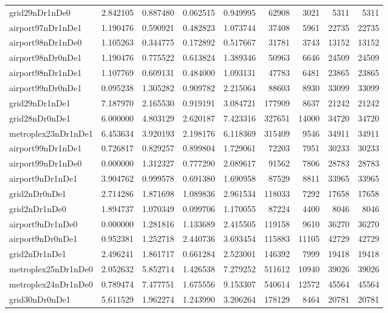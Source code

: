 \begin{longtable}{|l|r|r|r|r|r|r|r|r|}
grid29nDr1nDe0 & 2.842105 & 0.887480 & 0.062515 & 0.949995 & 62908 & 3021 & 5311 & 5311 \\
airport97nDr1nDe1 & 1.190476 & 0.590921 & 0.482823 & 1.073744 & 37408 & 5961 & 22735 & 22735 \\
airport98nDr1nDe0 & 1.105263 & 0.344775 & 0.172892 & 0.517667 & 31781 & 3743 & 13152 & 13152 \\
airport98nDr0nDe1 & 1.190476 & 0.775522 & 0.613824 & 1.389346 & 50963 & 6646 & 24509 & 24509 \\
airport98nDr1nDe1 & 1.107769 & 0.609131 & 0.484000 & 1.093131 & 47783 & 6481 & 23865 & 23865 \\
airport99nDr0nDe1 & 0.095238 & 1.305282 & 0.909782 & 2.215064 & 88603 & 8930 & 33099 & 33099 \\
grid29nDr1nDe1 & 7.187970 & 2.165530 & 0.919191 & 3.084721 & 177909 & 8637 & 21242 & 21242 \\
grid28nDr0nDe1 & 6.000000 & 4.803129 & 2.620187 & 7.423316 & 327651 & 14000 & 34720 & 34720 \\
metroplex23nDr1nDe1 & 6.453634 & 3.920193 & 2.198176 & 6.118369 & 315409 & 9546 & 34911 & 34911 \\
airport99nDr1nDe1 & 0.726817 & 0.829257 & 0.899804 & 1.729061 & 72203 & 7951 & 30233 & 30233 \\
airport99nDr1nDe0 & 0.000000 & 1.312327 & 0.777290 & 2.089617 & 91562 & 7806 & 28783 & 28783 \\
airport9nDr1nDe1 & 3.904762 & 0.999578 & 0.691380 & 1.690958 & 87529 & 8811 & 33965 & 33965 \\
grid2nDr0nDe1 & 2.714286 & 1.871698 & 1.089836 & 2.961534 & 118033 & 7292 & 17658 & 17658 \\
grid2nDr1nDe0 & 1.894737 & 1.070349 & 0.099706 & 1.170055 & 87224 & 4400 & 8046 & 8046 \\
airport9nDr1nDe0 & 0.000000 & 1.281816 & 1.133689 & 2.415505 & 119158 & 9610 & 36270 & 36270 \\
airport9nDr0nDe1 & 0.952381 & 1.252718 & 2.440736 & 3.693454 & 115883 & 11105 & 42729 & 42729 \\
grid2nDr1nDe1 & 2.496241 & 1.861717 & 0.661284 & 2.523001 & 146392 & 7999 & 19418 & 19418 \\
metroplex25nDr1nDe0 & 2.052632 & 5.852714 & 1.426538 & 7.279252 & 511612 & 10940 & 39026 & 39026 \\
metroplex24nDr1nDe0 & 0.789474 & 7.477751 & 1.675556 & 9.153307 & 540614 & 12572 & 45564 & 45564 \\
grid30nDr0nDe1 & 5.611529 & 1.962274 & 1.243990 & 3.206264 & 178129 & 8464 & 20781 & 20781 \\

\end{longtable}
